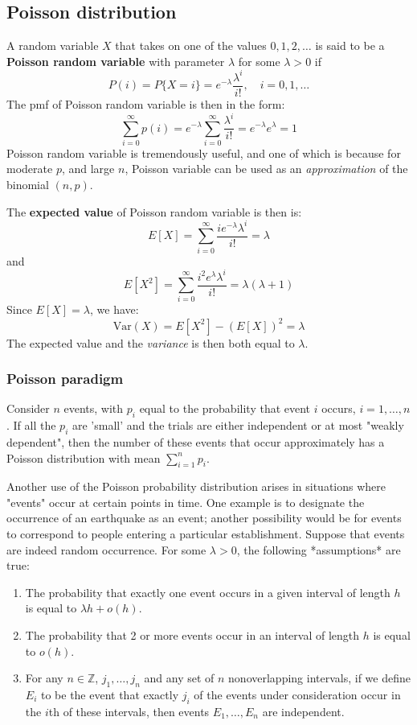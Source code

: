\subsection{Poisson distribution}
A random variable $X$ that takes on one of the values $0,1,2,\dots$ is said to be a \textbf{Poisson random variable} with parameter $\lambda$ for some $\lambda>0$ if $$P(i)=P\{ X=i \}=e^{-\lambda} \frac{\lambda^{i}}{i!},\quad i=0,1,\dots$$
The pmf of Poisson random variable is then in the form: $$\sum^{\infty}_{i=0}p(i)=e^{-\lambda}\sum^{\infty}_{i=0} \frac{\lambda^{i}}{i!}=e^{-\lambda}e^{\lambda}=1$$
Poisson random variable is tremendously useful, and one of which is because for moderate $p$, and large $n$, Poisson variable can be used as an \textit{approximation} of the binomial $(n,p)$. 

The \textbf{expected value} of Poisson random variable is then is: $$E[X]=\sum^{\infty}_{i=0}\frac{ie^{-\lambda}\lambda^{i}}{i!}=\lambda$$
and $$E[X^{2}]=\sum^{\infty}_{i=0} \frac{i^{2}e^{\lambda}\lambda^{i}}{i!}=\lambda(\lambda+1)$$
Since $E[X]=\lambda$, we have: $$\mathrm{Var}(X)=E[X^{2}]-(E[X])^{2}=\lambda$$
The expected value and the \textit{variance} is then both equal to $\lambda$. 
\subsubsection{Poisson paradigm}
Consider $n$ events, with $p_{i}$ equal to the probability that event $i$ occurs, $i=1,\dots,n$. If all the $p_{i}$ are 'small' and the trials are either independent or at most "weakly dependent", then the number of these events that occur approximately has a Poisson distribution with mean $\sum_{i=1}^{n}p_{i}$. 

Another use of the Poisson probability distribution arises in situations where "events" occur at certain points in time. One example is to designate the occurrence of an earthquake as an event; another possibility would be for events to correspond to people entering a particular establishment. Suppose that events are indeed random occurrence. For some $\lambda>0$, the following *assumptions* are true: 
\begin{enumerate}
    \item The probability that exactly one event occurs in a given interval of length $h$ is equal to $\lambda h+o(h)$. 
    \item The probability that 2 or more events occur in an interval of length $h$ is equal to $o(h)$. 
    \item For any $n\in\mathbb{Z}$, $j_{1},\dots,j_{n}$ and any set of $n$ nonoverlapping intervals, if we define $E_{i}$ to be the event that exactly $j_{i}$ of the events under consideration occur in the $i$th of these intervals, then events $E_{1},\dots,E_{n}$ are independent. 
\end{enumerate}
